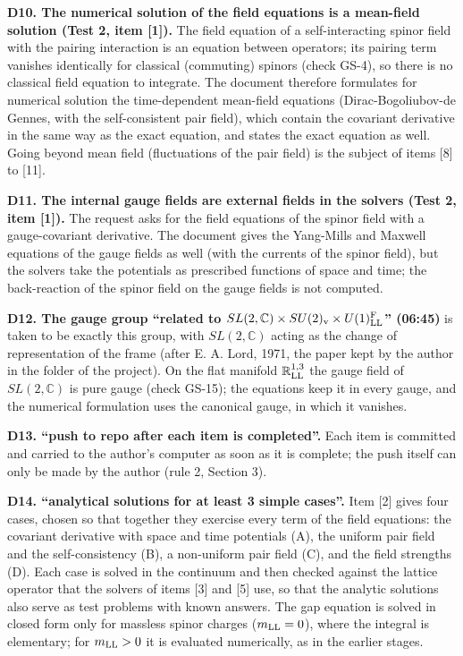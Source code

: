 \documentclass[
  10pt,
]{article}
\begin{document}
\textbf{D10. The numerical solution of the field equations is a
mean-field solution (Test 2, item {[}1{]}).} The field equation of a
self-interacting spinor field with the pairing interaction is an
equation between operators; its pairing term vanishes identically for
classical (commuting) spinors (check GS-4), so there is no classical
field equation to integrate. The document therefore formulates for
numerical solution the time-dependent mean-field equations
(Dirac-Bogoliubov-de Gennes, with the self-consistent pair field), which
contain the covariant derivative in the same way as the exact equation,
and states the exact equation as well. Going beyond mean field
(fluctuations of the pair field) is the subject of items {[}8{]} to
{[}11{]}.

\textbf{D11. The internal gauge fields are external fields in the
solvers (Test 2, item {[}1{]}).} The request asks for the field
equations of the spinor field with a gauge-covariant derivative. The
document gives the Yang-Mills and Maxwell equations of the gauge fields
as well (with the currents of the spinor field), but the solvers take
the potentials as prescribed functions of space and time; the
back-reaction of the spinor field on the gauge fields is not computed.

\textbf{D12. The gauge group ``related to
\(SL(2,\mathbb C)\times SU(2)_{\rm v}\times U(1)^{\rm F}_{\rm LL}\)''
(06:45)} is taken to be exactly this group, with \(SL(2,\mathbb C)\)
acting as the change of representation of the frame (after E. A. Lord,
1971, the paper kept by the author in the folder of the project). On the
flat manifold \(\mathbb R^{1,3}_{\rm LL}\) the gauge field of
\(SL(2,\mathbb C)\) is pure gauge (check GS-15); the equations keep it
in every gauge, and the numerical formulation uses the canonical gauge,
in which it vanishes.

\textbf{D13. ``push to repo after each item is completed''.} Each item
is committed and carried to the author's computer as soon as it is
complete; the push itself can only be made by the author (rule 2,
Section 3).

\textbf{D14. ``analytical solutions for at least 3 simple cases''.} Item
{[}2{]} gives four cases, chosen so that together they exercise every
term of the field equations: the covariant derivative with space and
time potentials (A), the uniform pair field and the self-consistency
(B), a non-uniform pair field (C), and the field strengths (D). Each
case is solved in the continuum and then checked against the lattice
operator that the solvers of items {[}3{]} and {[}5{]} use, so that the
analytic solutions also serve as test problems with known answers. The
gap equation is solved in closed form only for massless spinor charges
(\(m_{\rm LL}=0\)), where the integral is elementary; for
\(m_{\rm LL}>0\) it is evaluated numerically, as in the earlier stages.
\end{document}
